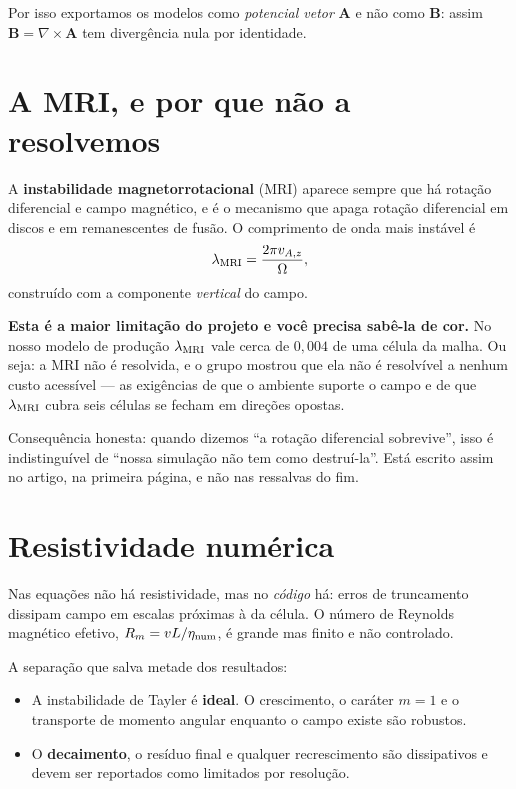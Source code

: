 \documentclass[11pt,a4paper]{article}
\begin{document}
Por isso exportamos os modelos como \emph{potencial vetor} $\mathbf{A}$ e não
como $\mathbf{B}$: assim $\mathbf{B} = \nabla\times\mathbf{A}$ tem divergência
nula por identidade.

\section{A MRI, e por que não a resolvemos}

A \textbf{instabilidade magnetorrotacional} (MRI) aparece sempre que há rotação
diferencial e campo magnético, e é o mecanismo que apaga rotação diferencial em
discos e em remanescentes de fusão. O comprimento de onda mais instável é
\begin{equation}
\lambda_{\rm MRI} = \frac{2\pi v_{A,z}}{\Omega},
\end{equation}
construído com a componente \emph{vertical} do campo.

\begin{alerta}
\textbf{Esta é a maior limitação do projeto e você precisa sabê-la de cor.}
No nosso modelo de produção $\lambda_{\rm MRI}$ vale cerca de $0{,}004$ de uma
célula da malha. Ou seja: a MRI não é resolvida, e o grupo mostrou que ela não
é resolvível a nenhum custo acessível --- as exigências de que o ambiente
suporte o campo e de que $\lambda_{\rm MRI}$ cubra seis células se fecham em
direções opostas.

Consequência honesta: quando dizemos ``a rotação diferencial sobrevive'', isso
é indistinguível de ``nossa simulação não tem como destruí-la''. Está escrito
assim no artigo, na primeira página, e não nas ressalvas do fim.
\end{alerta}

\section{Resistividade numérica}

Nas equações não há resistividade, mas no \emph{código} há: erros de truncamento
dissipam campo em escalas próximas à da célula. O número de Reynolds magnético
efetivo, $R_m = vL/\eta_{\rm num}$, é grande mas finito e não controlado.

A separação que salva metade dos resultados:
\begin{itemize}
\item A instabilidade de Tayler é \textbf{ideal}. O crescimento, o caráter
      $m=1$ e o transporte de momento angular enquanto o campo existe são
      robustos.
\item O \textbf{decaimento}, o resíduo final e qualquer recrescimento são
      dissipativos e devem ser reportados como limitados por resolução.
\end{itemize}
\end{document}
